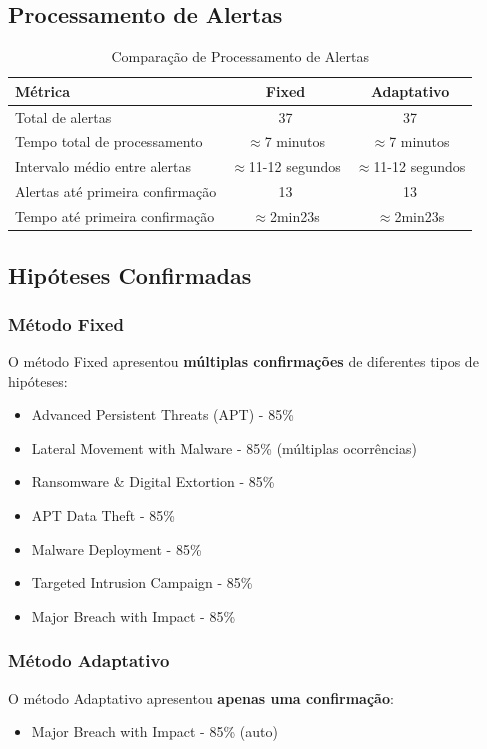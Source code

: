 \documentclass[10pt,a4paper]{article}
\begin{document}
\subsection{Processamento de Alertas}

\begin{table}[h]
\centering
\caption{Comparação de Processamento de Alertas}
\begin{tabular}{@{}lcc@{}}
\toprule
\textbf{Métrica} & \textbf{Fixed} & \textbf{Adaptativo} \\
\midrule
Total de alertas & 37 & 37 \\
Tempo total de processamento & $\approx$7 minutos & $\approx$7 minutos \\
Intervalo médio entre alertas & $\approx$11-12 segundos & $\approx$11-12 segundos \\
Alertas até primeira confirmação & 13 & 13 \\
Tempo até primeira confirmação & $\approx$2min23s & $\approx$2min23s \\
\bottomrule
\end{tabular}
\end{table}

\subsection{Hipóteses Confirmadas}

\subsubsection{Método Fixed}
O método Fixed apresentou \textbf{múltiplas confirmações} de diferentes tipos de hipóteses:
\begin{itemize}
\item Advanced Persistent Threats (APT) - 85\%
\item Lateral Movement with Malware - 85\% (múltiplas ocorrências)
\item Ransomware \& Digital Extortion - 85\%
\item APT Data Theft - 85\%
\item Malware Deployment - 85\%
\item Targeted Intrusion Campaign - 85\%
\item Major Breach with Impact - 85\%
\end{itemize}

\subsubsection{Método Adaptativo}
O método Adaptativo apresentou \textbf{apenas uma confirmação}:
\begin{itemize}
\item Major Breach with Impact - 85\% (auto)
\end{itemize}
\end{document}
